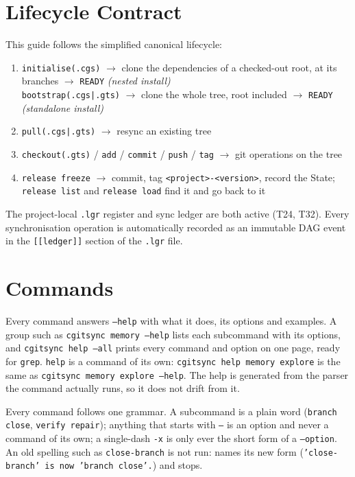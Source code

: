 \section{Lifecycle Contract}

This guide follows the simplified canonical lifecycle:

\begin{enumerate}
  \item \texttt{initialise(.cgs)} $\rightarrow$ clone the dependencies of a
        checked-out root, at its branches $\rightarrow$ \texttt{READY}  \textit{(nested install)}\\
        \texttt{bootstrap(.cgs|.gts)} $\rightarrow$ clone the whole tree, root
        included $\rightarrow$ \texttt{READY}  \textit{(standalone install)}
  \item \texttt{pull(.cgs|.gts)} $\rightarrow$ resync an existing tree
  \item \texttt{checkout(.gts)} / \texttt{add} / \texttt{commit} / \texttt{push} / \texttt{tag}
        $\rightarrow$ git operations on the tree
  \item \texttt{release freeze} $\rightarrow$ commit, tag \texttt{<project>-<version>}, record the State; \texttt{release list} and \texttt{release load} find it and go back to it
\end{enumerate}

The project-local \texttt{.lgr} register and sync ledger are both active (T24,
T32).  Every synchronisation operation is automatically recorded as an immutable
DAG event in the \texttt{[[ledger]]} section of the \texttt{.lgr} file.

\section{Commands}

Every command answers \texttt{--help} with what it does, its options and
examples. A group such as \texttt{cgitsync memory --help} lists each
subcommand with its options, and \texttt{cgitsync help --all} prints every
command and option on one page, ready for \texttt{grep}. \texttt{help} is a
command of its own: \texttt{cgitsync help memory explore} is the same as
\texttt{cgitsync memory explore --help}. The help is generated
from the parser the command actually runs, so it does not drift from it.

Every command follows one grammar. A subcommand is a plain word
(\texttt{branch close}, \texttt{verify repair}); anything that starts with
\texttt{--} is an option and never a command of its own; a single-dash
\texttt{-x} is only ever the short form of a \texttt{--option}. An old spelling
such as \texttt{close-branch} is not run: \cgscli{} names its new form
(\texttt{'close-branch' is now 'branch close'.}) and stops.

